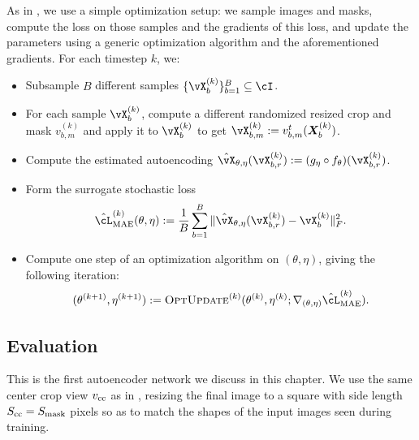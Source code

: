 \documentclass[../../book-main.tex]{subfiles}
\begin{document}
As in , we use a simple optimization setup: we sample images and masks, compute the loss on those samples and the gradients of this loss, and update the parameters using a generic optimization algorithm and the aforementioned gradients. For each timestep \(k\), we:
\begin{itemize}
    \item Subsample \(B\) different samples \(\{\vX_{b}^{(k)}\}_{b = 1}^{B} \subseteq \cI\).
    \item For each sample \(\vX_{b}^{(k)}\), compute a different randomized resized crop and mask \(v_{b, m}^{(k)}\) and apply it to \(\vX_{b}^{(k)}\) to get \(\vX_{b, m}^{(k)} := v_{b, m}^{t}(\X_{b}^{(k)})\).
    \item Compute the estimated autoencoding \(\hat{\vX}_{\theta, \eta}(\vX_{b, r}^{(k)}) := (g_{\eta} \circ f_{\theta})(\vX_{b, r}^{(k)})\).
    \item Form the surrogate stochastic loss 
    \begin{equation}
        \hat{\cL}_{\mathrm{MAE}}^{(k)}(\theta, \eta) := \frac{1}{B}\sum_{b = 1}^{B}\norm{\hat{\vX}_{\theta, \eta}(\vX_{b, r}^{(k)}) - \vX_{b}^{(k)}}_{F}^{2}.
    \end{equation}
    \item Compute one step of an optimization algorithm on \((\theta, \eta)\), giving the following iteration:
    \begin{equation}
        (\theta^{(k + 1)}, \eta^{(k + 1)}) := \textsc{OptUpdate}^{(k)}(\theta^{(k)}, \eta^{(k)}; \nabla_{(\theta, \eta)}\hat{\cL}_{\mathrm{MAE}}^{(k)}).
    \end{equation}
\end{itemize}

\subsection{Evaluation}\label{sub:image_completion_optimization}

This is the first autoencoder network we discuss in this chapter. We use the same center crop view \(v_{\mathrm{cc}}\) as in , resizing the final image to a square with side length \(S_{\mathrm{cc}} = S_{\mathrm{mask}}\) pixels so as to match the shapes of the input images seen during training. 
\end{document}
